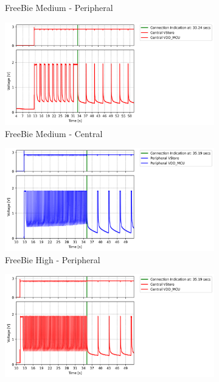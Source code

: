\begin{figure}[t]
\begin{subfigure}{0.5\linewidth}
        \caption{\scriptsize{FreeBie Medium - Peripheral}}
        \vspace{1\baselineskip}
    \end{subfigure}\hfill
    \begin{subfigure}{0.5\linewidth}
        \centering
        \includegraphics[width=1\linewidth]{chapters/Results/Connection_FreeBie_medium_central.png}
        \caption{\scriptsize{FreeBie Medium - Central}}
        \vspace{1\baselineskip}
    \end{subfigure}
    \begin{subfigure}{0.5\linewidth}
        \centering
        \includegraphics[width=1\linewidth]{chapters/Results/Connection_FreeBie_high_peripheral.png}
        \caption{\scriptsize{FreeBie High - Peripheral}}
    \end{subfigure} \hfill
    \begin{subfigure}{0.5\linewidth}
        \centering
        \includegraphics[width=1\linewidth]{chapters/Results/Connection_FreeBie_high_central.png}

\end{subfigure}
\end{figure}
